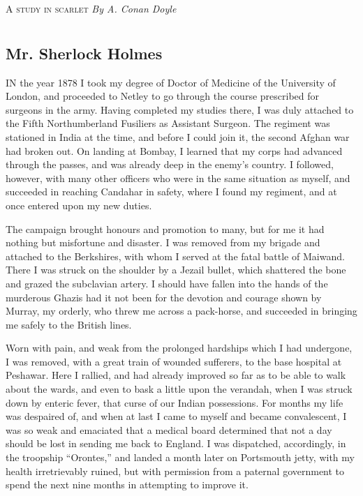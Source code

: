 \documentclass[12pt]{book}
\begin{document}
\thispagestyle{empty}

\begin{center}
\textsc{\huge A study in scarlet}
\vfill
\textsl{\large By A. Conan Doyle}
\end{center}

\clearpage
\thispagestyle{empty}

\part{}

\chapter{Mr. Sherlock Holmes}

IN the year 1878 I took my degree of Doctor of Medicine of the University of London, and proceeded to Netley to go through the course prescribed for surgeons in the army. Having completed my studies there, I was duly attached to the Fifth Northumberland Fusiliers as Assistant Surgeon. The regiment was stationed in India at the time, and before I could join it, the second Afghan war had broken out. On landing at Bombay, I learned that my corps had advanced through the passes, and was already deep in the enemy’s country. I followed, however, with many other officers who were in the same situation as myself, and succeeded in reaching Candahar in safety, where I found my regiment, and at once entered upon my new duties. 

The campaign brought honours and promotion to many, but for me it had nothing but misfortune and disaster. I was removed from my brigade and attached to the Berkshires, with whom I served at the fatal battle of Maiwand. There I was struck on the shoulder by a Jezail bullet, which shattered the bone and grazed the subclavian artery. I should have fallen into the hands of the murderous Ghazis had it not been for the devotion and courage shown by Murray, my orderly, who threw me across a pack-horse, and succeeded in bringing me safely to the British lines. 

Worn with pain, and weak from the prolonged hardships which I had undergone, I was removed, with a great train of wounded sufferers, to the base hospital at Peshawar. Here I rallied, and had already improved so far as to be able to walk about the wards, and even to bask a little upon the verandah, when I was struck down by enteric fever, that curse of our Indian possessions. For months my life was despaired of, and when at last I came to myself and became convalescent, I was so weak and emaciated that a medical board determined that not a day should be lost in sending me back to England. I was dispatched, accordingly, in the troopship “Orontes,” and landed a month later on Portsmouth jetty, with my health irretrievably ruined, but with permission from a paternal government to spend the next nine months in attempting to improve it. 
\end{document}
